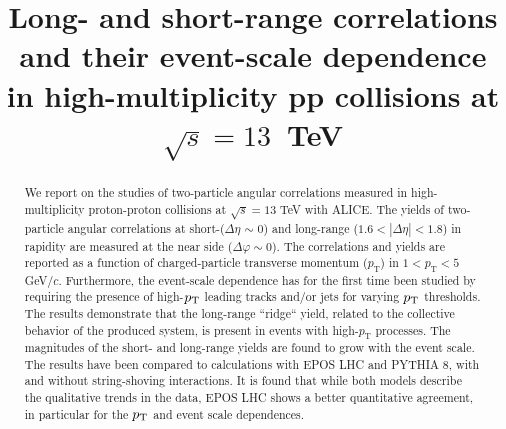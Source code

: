 \documentclass[ALICE,manyauthors]{cernphprep}
\begin{document}
\begin{titlepage}

\PHyear{}
\PHdate{\today}
%

\title{Long- and short-range correlations and their event-scale dependence in high-multiplicity pp collisions at $\sqrt{s} = 13$~TeV}


\begin{abstract}
%
We report on the studies of two-particle angular correlations measured in high-multiplicity proton-proton collisions at $\sqrt{s} =13$ TeV with ALICE. 
The yields of two-particle angular correlations at short-($\Delta\eta$ $\sim$ 0) and long-range ($1.6 < |\Delta\eta| < 1.8$) in rapidity are measured at the near side ($\Delta\varphi \sim 0$).
The correlations and yields are reported as a function of charged-particle transverse momentum ($p_{\mathrm T}$) in $1 < p_{\mathrm T} < 5$ GeV/$c$.
Furthermore, the event-scale dependence has for the first time been studied by requiring the presence of high-$p_{\rm T}$ leading tracks and/or jets for varying $p_{\rm T}$ thresholds. 
The results demonstrate that the long-range ``ridge`` yield, related to the collective behavior of the produced system, is present in events with high-$p_{\mathrm T}$ processes. The magnitudes of the short- and long-range yields are found to grow with the event scale. 
The results have been compared to calculations with EPOS LHC and PYTHIA 8, with and without string-shoving interactions. It is found that while both models describe the qualitative trends in the data, EPOS LHC shows a better quantitative agreement, in particular for the $p_{\rm T}$ and event scale dependences.


\end{abstract}
\end{titlepage}
\end{document}
